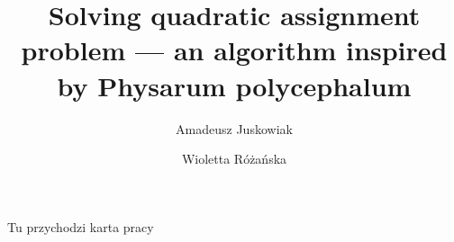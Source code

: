 \documentclass[english,a4paper,twoside]{ppfcmthesis}
\author{
   Amadeusz Juskowiak \album{106453} \and
   Wioletta Różańska \album{106651}}
\title{Solving quadratic assignment problem --– an algorithm inspired by Physarum polycephalum}
\begin{document}
\graphicspath{{figures/}}
\frontmatter\pagestyle{empty}%
\maketitle\cleardoublepage%

% 
{
  \vspace*{\fill}
  \centerline{Tu przychodzi karta pracy}
  \vspace*{\fill}
}
\cleardoublepage



\cleardoublepage

\cleardoublepage

\pagestyle{ppfcmthesis}%
\tableofcontents* \cleardoublepage%

\mainmatter%











\cleardoublepage\appendix







{\raggedright\sloppy\small}

\cleardoublepage\ppcolophon
\end{document}
